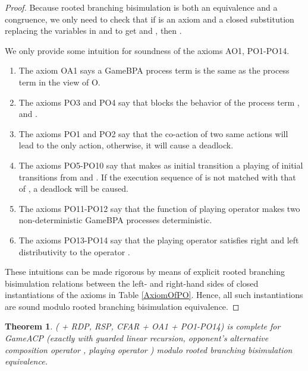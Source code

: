 \documentclass{fac}
\newtheorem{theorem}{Theorem}[section]
\begin{document}
\begin{proof}
Because rooted branching bisimulation is both an equivalence and a congruence, we only need to check that if  is an axiom and a closed substitution  replacing the variables in  and  to get  and , then .

We only provide some intuition for soundness of the axioms AO1, PO1-PO14.

\begin{enumerate}
  \item The axiom OA1 says a GameBPA process term  is the same as the process term  in the view of O.
  \item The axioms PO3 and PO4 say that  blocks the behavior of the process term ,  and .
  \item The axioms PO1 and PO2 say that the co-action of two same actions will lead to the only action, otherwise, it will cause a deadlock.
  \item The axioms PO5-PO10 say that  makes as initial transition a playing of initial transitions from  and . If the execution sequence of  is not matched with that of , a deadlock will be caused.
  \item The axioms PO11-PO12 say that the function of playing operator makes two non-deterministic GameBPA processes deterministic.
  \item The axioms PO13-PO14 say that the playing operator satisfies right and left distributivity to the operator .
\end{enumerate}

These intuitions can be made rigorous by means of explicit rooted branching bisimulation relations between the left- and right-hand sides of closed instantiations of the axioms in Table \ref{AxiomOfPO}. Hence, all such instantiations are sound modulo rooted branching bisimulation equivalence.
\end{proof}

\begin{theorem}
 ( + RDP, RSP, CFAR + OA1 + PO1-PO14) is complete for GameACP (exactly  with guarded linear recursion, opponent's alternative composition operator , playing operator ) modulo rooted branching bisimulation equivalence.
\end{theorem}
\end{document}
